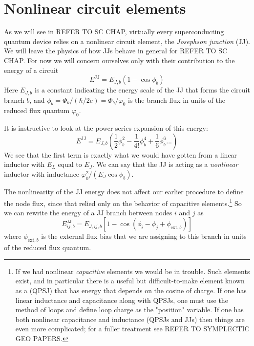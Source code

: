 \section{Nonlinear circuit elements}
As we will see in REFER TO SC CHAP, virtually every superconducting quantum device relies on a nonlinear circuit element, the \textit{Josephson junction} (JJ). We will leave the physics of how JJs behave in general for REFER TO SC CHAP. For now we will concern ourselves only with their contribution to the energy of a circuit
\begin{equation}
	\label{eq:EJJbranch}
	E^\mathrm{JJ} = E_{J,b} (1 - \cos \phi_b)
\end{equation}
Here $E_{J,b}$ is a constant indicating the energy scale of the JJ that forms the circuit branch $b$, and $\phi_b = \Phi_b / (\hbar / 2 e) = \Phi_b / \varphi_0$ is the branch flux in units of the reduced flux quantum $\varphi_0$.

It is instructive to look at the power series expansion of this energy:
\begin{equation*}
	E^\mathrm{JJ} = E_{J,b}\left(\frac{1}{2}\phi_b^2 - \frac{1}{4!}\phi_b^4 + \frac{1}{6}\phi_b^6...\right)
\end{equation*}
We see that the first term is exactly what we would have gotten from a linear inductor with $E_L$ equal to $E_J$. We can say that the JJ is acting as a \textit{nonlinear} inductor with inductance $\varphi_0^2/(E_J\cos\phi_b)$. 

The nonlinearity of the JJ energy does not affect our earlier procedure to define the node flux, since that relied only on the behavior of capacitive elements.\footnote{If we had nonlinear \textit{capacitive} elements we would be in trouble. Such elements exist, and in particular there is a useful but difficult-to-make element known as a  (QPSJ) that has energy that depends on the cosine of charge. If one has linear inductance and capacitance along with QPSJs, one must use the method of loops and define loop charge as the "position" variable. If one has both nonlinear capacitance and inductance (QPSJs and JJs) then things are even more complicated; for a fuller treatment see REFER TO SYMPLECTIC GEO PAPERS.} So we can rewrite the energy of a JJ branch between nodes $i$ and $j$ as 
\begin{equation}
	\label{eq:EJJnode}
	E^\mathrm{JJ}_{ij,b} = E_{J,ij,b}\left[1-\cos\left(\phi_i-\phi_j + \phi_{\mathrm{ext},b}\right) \right]
\end{equation}
where $\phi_{\mathrm{ext},b}$ is the external flux bias that we are assigning to this branch in units of the reduced flux quantum. 

